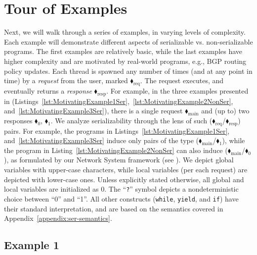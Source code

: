 \appendix


\section{Tour of Examples}
\label{appendix:tour}


Next, we will walk through a series of examples, in varying levels of complexity. Each example will demonstrate different aspects of serializable vs. non-serializable programs.
%
The first examples are relatively basic, while the last examples have higher complexity and are motivated by real-world programs, e.g., BGP routing policy updates.
%
Each thread is spawned any number of times (and at any point in time) by a \textit{request} from the user, marked {\color{ForestGreen}$\blacklozenge_\text{req}$}. The request executes, and eventually returns a \textit{response}  {\color{red}$\blacklozenge_\text{resp}$}.
%
For example, in the three examples presented in  (Listings~\ref{lst:MotivatingExample1Ser},~\ref{lst:MotivatingExample2NonSer}, and~\ref{lst:MotivatingExample3Ser}), there is a single request {\color{ForestGreen}$\blacklozenge_\text{main}$} and (up to) two responses {\color{red}$\blacklozenge_0$}, {\color{red}$\blacklozenge_1$}.
% 
We analyze serializability through the lens of such ({\color{ForestGreen}$\blacklozenge_\text{req}$}/{\color{red}$\blacklozenge_\text{resp}$}) pairs. For example, the programs in Listings~\ref{lst:MotivatingExample1Ser}, and~\ref{lst:MotivatingExample3Ser} induce only pairs of the type ({\color{ForestGreen}$\blacklozenge_\text{main}$}/{\color{red}$\blacklozenge_1$}), while the program in Listing~\ref{lst:MotivatingExample2NonSer} can also induce ({\color{ForestGreen}$\blacklozenge_\text{main}$}/{\color{red}$\blacklozenge_0$}), as formulated by our Network System framework (see ). 
%
We depict global variables with upper-case characters, while local variables (per each request) are depicted with lower-case ones.
%
Unless explicitly stated otherwise, all global and local variables are initialized as 0.
%
The ``\texttt{?}'' symbol depicts a nondeterministic choice between ``0'' and ``1''. All other constructs (\texttt{while}, \texttt{yield}, and \texttt{if}) have their standard interpretation, and are based on the \toolname{} semantics covered in Appendix~\ref{appendix:ser-semantics}.

\subsection{Example 1}

